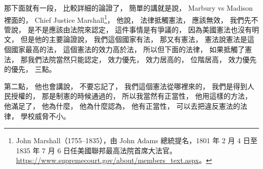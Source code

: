 \hypertarget{w02:cue:1867}{}那下面就有一段，
\hypertarget{w02:cue:1868}{}比較詳細的論證了，
\hypertarget{w02:cue:1869}{}簡單的講就是說，
\hypertarget{w02:cue:1870}{}Marbury vs Madison 裡面的，
\hypertarget{w02:cue:1871}{}Chief Justice Marshall\footnote{John Marshall（1755–1835），由 John Adams 總統提名，1801 年 2 月 4 日至 1835 年 7 月 6 日任美國聯邦最高法院首席大法官。\url{https://www.supremecourt.gov/about/members_text.aspx}。}，
\hypertarget{w02:cue:1872}{}他說，
\hypertarget{w02:cue:1873}{}法律抵觸憲法，
\hypertarget{w02:cue:1874}{}應該無效，
\hypertarget{w02:cue:1875}{}我們先不管說，
\hypertarget{w02:cue:1876}{}是不是應該由法院來認定，
\hypertarget{w02:cue:1877}{}這件事情是有爭議的，
\hypertarget{w02:cue:1878}{}因為美國憲法也沒有明文，
\hypertarget{w02:cue:1879}{}但是他的主要論證說，
\hypertarget{w02:cue:1880}{}我們這個國家有法，
\hypertarget{w02:cue:1881}{}那又有憲法，
\hypertarget{w02:cue:1882}{}憲法說憲法是這個國家最高的法，
\hypertarget{w02:cue:1883}{}這個憲法的效力高於法，
\hypertarget{w02:cue:1884}{}所以但下面的法律，
\hypertarget{w02:cue:1885}{}如果抵觸了憲法，
\hypertarget{w02:cue:1886}{}那我們法院當然只能認定，
\hypertarget{w02:cue:1887}{}效力優先，
\hypertarget{w02:cue:1888}{}效力居高的，
\hypertarget{w02:cue:1889}{}位階居高，
\hypertarget{w02:cue:1890}{}效力優先的優先，
\hypertarget{w02:cue:1891}{}三點。

\hypertarget{w02:cue:1892}{}第二點，
\hypertarget{w02:cue:1893}{}他也會講說，
\hypertarget{w02:cue:1894}{}不要忘記了，
\hypertarget{w02:cue:1895}{}我們這個憲法從哪裡來的，
\hypertarget{w02:cue:1896}{}我們是得到人民授權的，
\hypertarget{w02:cue:1897}{}那是制憲的時候通過的，
\hypertarget{w02:cue:1898}{}所以我當然有正當性，
\hypertarget{w02:cue:1899}{}他用這樣的方法，
\hypertarget{w02:cue:1900}{}他滿足了，
\hypertarget{w02:cue:1901}{}他為什麼，
\hypertarget{w02:cue:1902}{}他為什麼認為，
\hypertarget{w02:cue:1903}{}他有正當性，
\hypertarget{w02:cue:1904}{}可以去把違反憲法的法律，
\hypertarget{w02:cue:1905}{}學校威脅不小。

